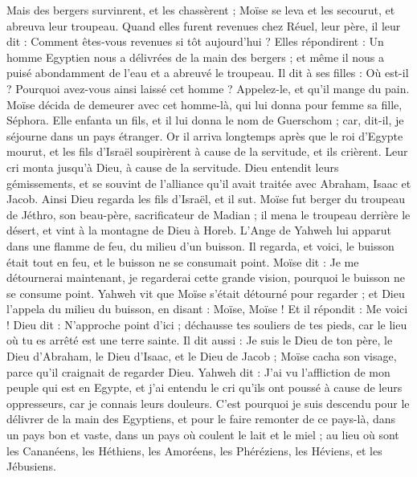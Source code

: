 \begin{multicols}{2}
Mais des bergers survinrent, et les chassèrent ; Moïse se leva et les secourut, et abreuva leur troupeau.
Quand elles furent revenues chez Réuel, leur père, il leur dit : Comment êtes-vous revenues si tôt aujourd'hui ?
Elles répondirent : Un homme Egyptien nous a délivrées de la main des bergers ; et même il nous a puisé abondamment de l'eau et a abreuvé le troupeau.
Il dit à ses filles : Où est-il ? Pourquoi avez-vous ainsi laissé cet homme ? Appelez-le, et qu'il mange du pain.
Moïse décida de demeurer avec cet homme-là, qui lui donna pour femme sa fille, Séphora.
Elle enfanta un fils, et il lui donna le nom de Guerschom ; car, dit-il, je séjourne dans un pays étranger.
Or il arriva longtemps après que le roi d'Egypte mourut, et les fils d'Israël soupirèrent à cause de la servitude, et ils crièrent. Leur cri monta jusqu'à Dieu, à cause de la servitude.
Dieu entendit leurs gémissements, et se souvint de l'alliance qu'il avait traitée avec Abraham, Isaac et Jacob.
Ainsi Dieu regarda les fils d'Israël, et il sut.
\VerseOne{}Moïse fut berger du troupeau de Jéthro, son beau-père, sacrificateur de Madian ; il mena le troupeau derrière le désert, et vint à la montagne de Dieu à Horeb.
L'Ange de Yahweh lui apparut dans une flamme de feu, du milieu d'un buisson. Il regarda, et voici, le buisson était tout en feu, et le buisson ne se consumait point.
Moïse dit : Je me détournerai maintenant, je regarderai cette grande vision, pourquoi le buisson ne se consume point.
Yahweh vit que Moïse s'était détourné pour regarder ; et Dieu l'appela du milieu du buisson, en disant : Moïse, Moïse ! Et il répondit : Me voici !
Dieu dit : N'approche point d'ici ; déchausse tes souliers de tes pieds, car le lieu où tu es arrêté est une terre sainte.
Il dit aussi : Je suis le Dieu de ton père, le Dieu d'Abraham, le Dieu d'Isaac, et le Dieu de Jacob ; Moïse cacha son visage, parce qu'il craignait de regarder Dieu.
Yahweh dit : J'ai vu l'affliction de mon peuple qui est en Egypte, et j'ai entendu le cri qu'ils ont poussé à cause de leurs oppresseurs, car je connais leurs douleurs.
C'est pourquoi je suis descendu pour le délivrer de la main des Egyptiens, et pour le faire remonter de ce pays-là, dans un pays bon et vaste, dans un pays où coulent le lait et le miel ; au lieu où sont les Cananéens, les Héthiens, les Amoréens, les Phéréziens, les Héviens, et les Jébusiens.

\end{multicols}
